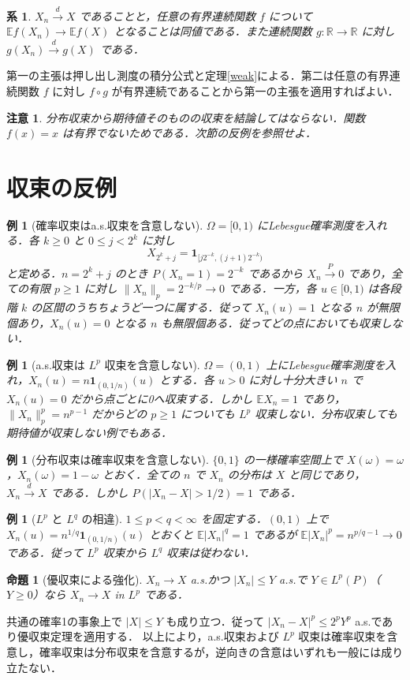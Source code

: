 \documentclass[a5paper,10pt,onecolumn]{jsarticle}
\makeatletter
\theoremstyle{mathnotetheorem}
\newtheorem{proposition}[theorem]{命題}
\newtheorem{corollary}[theorem]{系}
\newtheorem{example}[theorem]{例}
\newtheorem{remark}[theorem]{注意}
\renewcommand{\proofname}{証明}
\renewenvironment{proof}[1][\proofname]{%
  \par\pushQED{\qed}\normalfont\topsep4\p@\@plus2\p@\relax
  \trivlist\item[\hskip\labelsep\bfseries #1]\ignorespaces
}{\popQED\endtrivlist\@endpefalse}
\newcommand{\R}{\mathbb{R}}
\newcommand{\norm}[1]{\lVert #1\rVert}
\newcommand{\E}{\mathbb E}
\newcommand{\1}{\mathbf{1}}
\makeatother
\begin{document}
\begin{corollary}
$X_n\xrightarrow{d}X$ であることと，任意の有界連続関数 $f$ について $\E f(X_n)\to\E f(X)$ となることは同値である．また連続関数 $g:\R\to\R$ に対し $g(X_n)\xrightarrow{d}g(X)$ である．
\end{corollary}
\begin{proof}
第一の主張は押し出し測度の積分公式と定理\ref{weak}による．第二は任意の有界連続関数 $f$ に対し $f\circ g$ が有界連続であることから第一の主張を適用すればよい．
\end{proof}
\begin{remark}
分布収束から期待値そのものの収束を結論してはならない．関数 $f(x)=x$ は有界でないためである．次節の反例を参照せよ．
\end{remark}

\section{収束の反例}
\begin{example}[確率収束はa.s.収束を含意しない]\label{typewriter}
$\Omega=[0,1)$ にLebesgue確率測度を入れる．各 $k\ge0$ と $0\le j<2^k$ に対し
\[
 X_{2^k+j}=\1_{[j2^{-k},(j+1)2^{-k})}
\]
と定める．$n=2^k+j$ のとき $P(X_n=1)=2^{-k}$ であるから $X_n\xrightarrow{P}0$ であり，全ての有限 $p\ge1$ に対し $\norm{X_n}_p=2^{-k/p}\to0$ である．一方，各 $u\in[0,1)$ は各段階 $k$ の区間のうちちょうど一つに属する．従って $X_n(u)=1$ となる $n$ が無限個あり，$X_n(u)=0$ となる $n$ も無限個ある．従ってどの点においても収束しない．
\end{example}
\begin{example}[a.s.収束は $L^p$ 収束を含意しない]
$\Omega=(0,1)$ 上にLebesgue確率測度を入れ，$X_n(u)=n\1_{(0,1/n)}(u)$ とする．各 $u>0$ に対し十分大きい $n$ で $X_n(u)=0$ だから点ごとに0へ収束する．しかし $\E X_n=1$ であり，$\norm{X_n}_p^p=n^{p-1}$ だからどの $p\ge1$ についても $L^p$ 収束しない．分布収束しても期待値が収束しない例でもある．
\end{example}
\begin{example}[分布収束は確率収束を含意しない]
$\{0,1\}$ の一様確率空間上で $X(\omega)=\omega$，$X_n(\omega)=1-\omega$ とおく．全ての $n$ で $X_n$ の分布は $X$ と同じであり，$X_n\xrightarrow{d}X$ である．しかし $P(|X_n-X|>1/2)=1$ である．
\end{example}
\begin{example}[$L^p$ と $L^q$ の相違]
$1\le p<q<\infty$ を固定する．$(0,1)$ 上で $X_n(u)=n^{1/q}\1_{(0,1/n)}(u)$ とおくと $\E|X_n|^q=1$ であるが $\E|X_n|^p=n^{p/q-1}\to0$ である．従って $L^p$ 収束から $L^q$ 収束は従わない．
\end{example}
\begin{proposition}[優収束による強化]
$X_n\to X$ a.s.かつ $|X_n|\le Y$ a.s.で $Y\in L^p(P)$（$Y\ge0$）なら $X_n\to X$ in $L^p$ である．
\end{proposition}
\begin{proof}
共通の確率1の事象上で $|X|\le Y$ も成り立つ．従って $|X_n-X|^p\le 2^pY^p$ a.s.であり優収束定理を適用する．
\end{proof}
以上により，a.s.収束および $L^p$ 収束は確率収束を含意し，確率収束は分布収束を含意するが，逆向きの含意はいずれも一般には成り立たない．
\end{document}
